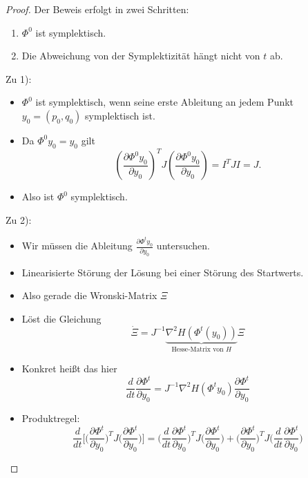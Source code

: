 \begin{proof}
 Der Beweis erfolgt in zwei Schritten:
  \begin{enumerate}
  \item $\Phi^0$ ist symplektisch.
  \item Die \glqq Abweichung von der Symplektizität\grqq{} hängt nicht von $t$ ab.
  \end{enumerate}

  Zu 1):
  \begin{itemize}
  \item $\Phi^0$ ist symplektisch, wenn seine erste Ableitung an jedem Punkt $y_0 = (p_0, q_0)$ symplektisch ist.
  \item Da $\Phi^0 y_0 = y_0$ gilt
    \begin{equation*}
      \left( \frac{\partial \Phi^0 y_0}{\partial y_0} \right)^T J \left( \frac{\partial \Phi^0 y_0}{\partial y_0} \right)
      = I^T J I
      = J.
    \end{equation*}
  \item Also ist $\Phi^0$ symplektisch.
  \end{itemize}

  Zu 2):
  \begin{itemize}
  \item Wir müssen die Ableitung $\frac{\partial \Phi^t y_0}{\partial y_0}$ untersuchen.
  \item Linearisierte Störung der Lösung bei einer Störung des Startwerts.
  \item Also gerade die Wronski-Matrix $\Xi$
  \item Löst die Gleichung
    \begin{equation*}
      \dot \Xi = J^{-1} \underbrace{\nabla^2 H( \Phi^t(y_0) )}_{\text{Hesse-Matrix von $H$}} \Xi
    \end{equation*}

  \item Konkret heißt das hier
    \begin{equation}
     \label{eq:wronski_symplectic_form}
      \frac{d}{dt} \frac{\partial \Phi^t}{\partial y_0}
      = J^{-1} \nabla^2 H(\Phi^t y_0) \frac{\partial \Phi^t}{\partial y_0}
    \end{equation}


  \item Produktregel:
   \begin{equation*}
    \frac{d}{dt}\bigg[ \bigg(\frac{\partial \Phi^t}{\partial y_0}\bigg)^T J \bigg(\frac{\partial \Phi^t}{\partial y_0}\bigg) \bigg]
    = \bigg( \frac{d}{dt} \frac{\partial \Phi^t}{\partial y_0} \bigg)^T J \bigg( \frac{\partial \Phi^t}{\partial y_0} \bigg)
    + \bigg( \frac{\partial \Phi^t}{\partial y_0} \bigg)^T J \bigg( \frac{d}{dt} \frac{\partial \Phi^t}{\partial y_0} \bigg)
    \end{equation*}


\end{itemize}
\end{proof}
